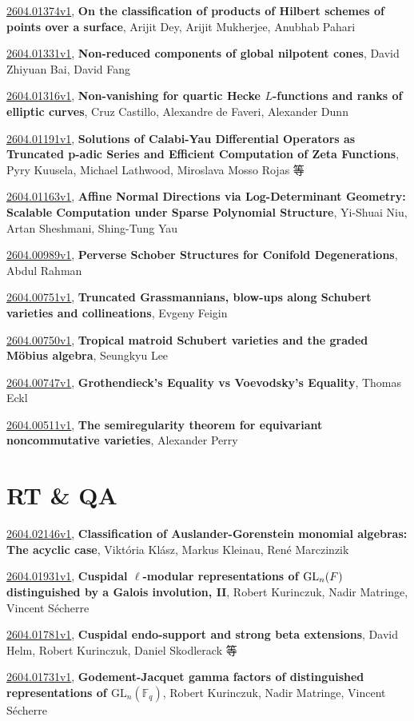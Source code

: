 \documentclass[9pt, a4paper]{article}
\theoremstyle{plain}
\theoremstyle{definition}
\theoremstyle{remark}
\newcommand{\arxiv}[3]{\href{https://arxiv.org/abs/#1}{#1}, \textbf{\textcolor{arxivblue}{#2}}, #3}
\begin{document}
\arxiv{2604.01374v1}{On the classification of products of Hilbert schemes of points over a surface}{Arijit Dey, Arijit Mukherjee, Anubhab Pahari}

\arxiv{2604.01331v1}{Non-reduced components of global nilpotent cones}{David Zhiyuan Bai, David Fang}

\arxiv{2604.01316v1}{Non-vanishing for quartic Hecke $L$-functions and ranks of elliptic curves}{Cruz Castillo, Alexandre de Faveri, Alexander Dunn}

\arxiv{2604.01191v1}{Solutions of Calabi-Yau Differential Operators as Truncated p-adic Series and Efficient Computation of Zeta Functions}{Pyry Kuusela, Michael Lathwood, Miroslava Mosso Rojas 等}

\arxiv{2604.01163v1}{Affine Normal Directions via Log-Determinant Geometry: Scalable Computation under Sparse Polynomial Structure}{Yi-Shuai Niu, Artan Sheshmani, Shing-Tung Yau}

\arxiv{2604.00989v1}{Perverse Schober Structures for Conifold Degenerations}{Abdul Rahman}

\arxiv{2604.00751v1}{Truncated Grassmannians, blow-ups along Schubert varieties and collineations}{Evgeny Feigin}

\arxiv{2604.00750v1}{Tropical matroid Schubert varieties and the graded Möbius algebra}{Seungkyu Lee}

\arxiv{2604.00747v1}{Grothendieck's Equality vs Voevodsky's Equality}{Thomas Eckl}

\arxiv{2604.00511v1}{The semiregularity theorem for equivariant noncommutative varieties}{Alexander Perry}


\section{RT \& QA}
\arxiv{2604.02146v1}{Classification of Auslander-Gorenstein monomial algebras: The acyclic case}{Viktória Klász, Markus Kleinau, René Marczinzik}

\arxiv{2604.01931v1}{Cuspidal $\ell$-modular representations of ${\rm GL}_n(F)$ distinguished by a Galois involution, II}{Robert Kurinczuk, Nadir Matringe, Vincent Sécherre}

\arxiv{2604.01781v1}{Cuspidal endo-support and strong beta extensions}{David Helm, Robert Kurinczuk, Daniel Skodlerack 等}

\arxiv{2604.01731v1}{Godement-Jacquet gamma factors of distinguished representations of $\mathrm{GL}_n(\mathbb{F}_q)$}{Robert Kurinczuk, Nadir Matringe, Vincent Sécherre}
\end{document}
